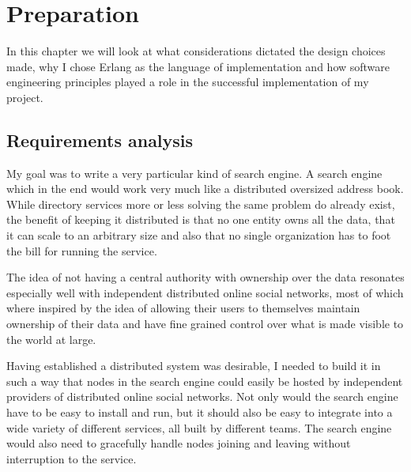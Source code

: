 

\chapter{Preparation}
In this chapter we will look at what considerations dictated the design choices made, why I chose Erlang as the language of implementation and how software engineering principles played a role in the successful implementation of my project.

\section{Requirements analysis}
My goal was to write a very particular kind of search engine. A search engine which in the end would work very much like a distributed oversized address book.
While directory services more or less solving the same problem do already exist, the benefit of keeping it distributed is that no one entity owns all the data, that it can scale to an arbitrary size and also that no single organization has to foot the bill for running the service.

The idea of not having a central authority with ownership over the data resonates especially well with independent distributed online social networks, most of which where inspired by the idea of allowing their users to themselves maintain ownership of their data and have fine grained control over what is made visible to the world at large.

Having established a distributed system was desirable, I needed to build it in such a way that nodes in the search engine could easily be hosted by independent providers of distributed online social networks. Not only would the search engine have to be easy to install and run, but it should also be easy to integrate into a wide variety of different services, all built by different teams. The search engine would also need to gracefully handle nodes joining and leaving without interruption to the service.

